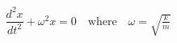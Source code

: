 \documentclass[preview]{standalone}
\begin{document}
\begin{align*}
\dfrac{d^2 x}{dt^2} + \omega^2 x = 0 \quad \text{where} \quad \omega = \sqrt{\frac{k}{m}}
\end{align*}
\end{document}
